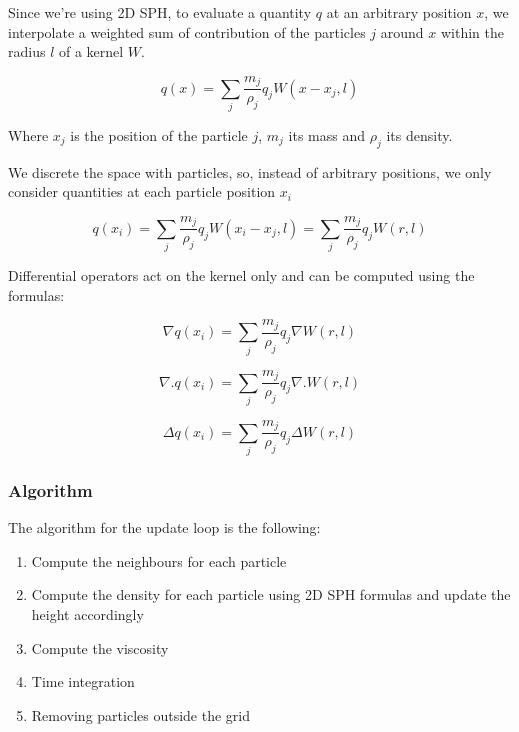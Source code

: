 Since we're using 2D SPH, to evaluate a quantity $q$ at an arbitrary position $x$, we interpolate a weighted sum of contribution of the particles $j$ around $x$ within the radius $l$ of a kernel $W$.

\begin{equation}\label{sph}
    q(x) = \sum_j{\frac{m_j}{\rho_j}q_jW(x-x_j, l)}
\end{equation}

Where $x_j$ is the position of the particle $j$, $m_j$ its mass and $\rho_j$ its density.

We discrete the space with particles, so, instead of arbitrary positions, we only consider quantities at each particle position $x_i$

\begin{equation}\label{sph discrete}
    q(x_i) = \sum_j{\frac{m_j}{\rho_j}q_jW(x_i-x_j, l)} = \sum_j{\frac{m_j}{\rho_j}q_jW(r, l)}
\end{equation}

Differential operators act on the kernel only and can be computed using the formulas:

\begin{equation}\label{sph gradient}
    \nabla q(x_i) = \sum_j{\frac{m_j}{\rho_j} q_j \nabla W(r, l)}
\end{equation}

\begin{equation}\label{sph divergence}
    \nabla.q(x_i) = \sum_j{\frac{m_j}{\rho_j} q_j \nabla.W(r, l)}
\end{equation}

\begin{equation}\label{sph laplacien}
    \Delta q(x_i) = \sum_j{\frac{m_j}{\rho_j} q_j \Delta W(r, l)}
\end{equation}

\subsubsection{Algorithm}

The algorithm for the update loop is the following:

\begin{enumerate}
    \item Compute the neighbours for each particle
    \item Compute the density for each particle using 2D SPH formulas and update the height accordingly
    \item Compute the viscosity
    \item Time integration
    \item Removing particles outside the grid
\end{enumerate}

